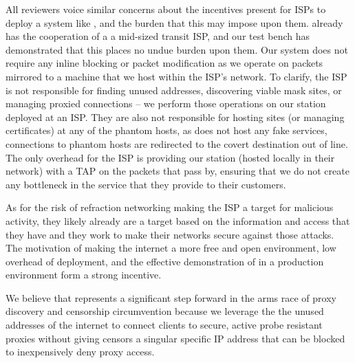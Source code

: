 All reviewers voice similar concerns about the incentives present for ISPs to deploy a system like
\scheme, and the burden that this may impose upon them. \scheme already has the cooperation of a 
a mid-sized transit ISP, and our test bench has demonstrated that this places
no undue burden upon them. Our system does not require any inline blocking or packet modification 
as we operate on packets mirrored to a machine that we host within the ISP's network. 
To clarify, the ISP is not responsible for finding unused addresses, discovering viable mask sites, 
or managing proxied connections -- we perform those operations on our station deployed
at an ISP. They are also not responsible for hosting sites (or managing certificates) at any of the 
phantom hosts, as \scheme does not host any fake services, connections to phantom hosts are 
redirected to the covert destination out of line. The only overhead 
for the ISP is providing our station (hosted locally in their network) with a TAP on the packets that 
pass by, ensuring that we do not create any bottleneck in the service that they provide to their customers. 

As for the risk of refraction networking making the ISP a target for malicious activity, they likely already
are a target based on the information and access that they have and they work to make their networks 
secure against those attacks. The motivation of making the internet a more free and open environment,
low overhead of deployment, and the effective demonstration of \scheme in a production environment 
form a strong incentive. 

We believe that \scheme represents a significant step forward in the arms race of proxy
discovery and censorship circumvention because we leverage the the unused addresses of the internet
to connect clients to secure, active probe resistant proxies without giving censors a singular 
specific IP address that can be blocked to inexpensively deny proxy access.

